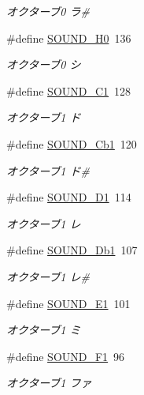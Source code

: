 \begin{DoxyCompactItemize}
\begin{DoxyCompactList}\small\item\em オクターブ0 ラ\# \end{DoxyCompactList}\item 
\#define \hyperlink{sound_8h_af77d6e42768c9e8407091ab9237c23e8_af77d6e42768c9e8407091ab9237c23e8}{S\+O\+U\+N\+D\+\_\+\+H0}~136
\begin{DoxyCompactList}\small\item\em オクターブ0 シ \end{DoxyCompactList}\item 
\#define \hyperlink{sound_8h_acc40de3e4447b500abf6a8f52690eb7a_acc40de3e4447b500abf6a8f52690eb7a}{S\+O\+U\+N\+D\+\_\+\+C1}~128
\begin{DoxyCompactList}\small\item\em オクターブ1 ド \end{DoxyCompactList}\item 
\#define \hyperlink{sound_8h_a71cd098d1835193a4082f62c92bd1560_a71cd098d1835193a4082f62c92bd1560}{S\+O\+U\+N\+D\+\_\+\+Cb1}~120
\begin{DoxyCompactList}\small\item\em オクターブ1 ド\# \end{DoxyCompactList}\item 
\#define \hyperlink{sound_8h_abc56b27ce3a779cca007c05bd85be4fd_abc56b27ce3a779cca007c05bd85be4fd}{S\+O\+U\+N\+D\+\_\+\+D1}~114
\begin{DoxyCompactList}\small\item\em オクターブ1 レ \end{DoxyCompactList}\item 
\#define \hyperlink{sound_8h_a38bf3c917fff3545f77a76715ad4b0f4_a38bf3c917fff3545f77a76715ad4b0f4}{S\+O\+U\+N\+D\+\_\+\+Db1}~107
\begin{DoxyCompactList}\small\item\em オクターブ1 レ\# \end{DoxyCompactList}\item 
\#define \hyperlink{sound_8h_a1009235392ed7690560707d81815b36b_a1009235392ed7690560707d81815b36b}{S\+O\+U\+N\+D\+\_\+\+E1}~101
\begin{DoxyCompactList}\small\item\em オクターブ1 ミ \end{DoxyCompactList}\item 
\#define \hyperlink{sound_8h_a48a50ebd455ec326ce52ba3f9e063baa_a48a50ebd455ec326ce52ba3f9e063baa}{S\+O\+U\+N\+D\+\_\+\+F1}~96
\begin{DoxyCompactList}\small\item\em オクターブ1 ファ \end{DoxyCompactList}\item 

\end{DoxyCompactItemize}
